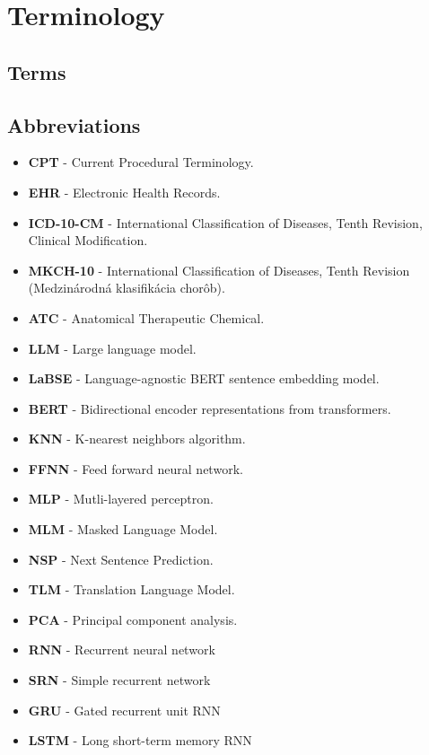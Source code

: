 
\chapter*{Terminology}

\section*{Terms}

    \setlength\itemsep{1px}

\section*{Abbreviations}

\begin{itemize}
    \setlength\itemsep{1px}
    \item \textbf{CPT} - Current Procedural Terminology.
    \item \textbf{EHR} - Electronic Health Records.
    \item \textbf{ICD-10-CM} - International Classification of Diseases, Tenth Revision, Clinical Modification.
    \item \textbf{MKCH-10} - International Classification of Diseases, Tenth Revision (Medzinárodná klasifikácia chorôb).
    \item \textbf{ATC} - Anatomical Therapeutic Chemical.
    \item \textbf{LLM} - Large language model. 
    \item \textbf{LaBSE} - Language-agnostic BERT sentence embedding model.
    \item \textbf{BERT} - Bidirectional encoder representations from transformers.
    \item \textbf{KNN} - K-nearest neighbors algorithm.
    \item \textbf{FFNN} - Feed forward neural network.
    \item \textbf{MLP} - Mutli-layered perceptron.
    \item \textbf{MLM} - Masked Language Model.
    \item \textbf{NSP} - Next Sentence Prediction. 
    \item \textbf{TLM} - Translation Language Model.
    \item \textbf{PCA} - Principal component analysis.
    \item \textbf{RNN} - Recurrent neural network
    \item \textbf{SRN} - Simple recurrent network
    \item \textbf{GRU} - Gated recurrent unit RNN
    \item \textbf{LSTM} - Long short-term memory RNN
\end{itemize}



